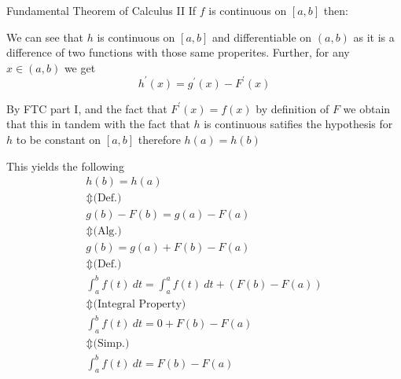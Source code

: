 \begin{theo*}{Fundamental Theorem of Calculus II}
  If $f$ is continuous on $ \left[ a, b \right]$ then:
      \item We can see that $h$ is continuous on $ \left[ a, b \right]$ and differentiable on $ \left(  a, b \right)$ as it is a difference of two functions with those same properites. Further, for any $x \in  \left( a, b \right)$ we get
        \[
        h ^{\prime}\left(x\right) = g ^{\prime}\left(x\right)  -  F ^{\prime}\left(x\right)
        \]
      \item By FTC part I, and the fact that $F ^{\prime}\left(x\right) = f\left(x\right)$ by definition of $F$ we obtain that 
        this in tandem with the fact that $h$ is continuous satifies the hypothesis for $h$ to be constant on $ \left[ a,b \right]$ therefore $h\left(a\right) = h\left(b\right)$ 
      \item This yields the following
        \begin{gather*}
          h\left(b\right) = h\left(a\right) \\
          \Updownarrow \text{(Def.)} \\
          g\left(b\right)  -  F\left(b\right) = g\left(a\right)  -  F\left(a\right)\\
          \Updownarrow \text{(Alg.)} \\
          g\left(b\right)  =    g\left(a\right) + F\left(b\right)  -  F\left(a\right)\\
          \Updownarrow \text{(Def.)} \\
          \int _{a} ^{b} f\left(t\right)\: dt = \int _{a} ^{a} f\left(t\right)\: dt   +  \left( F\left(b\right)  -  F\left(a\right) \right) \\
          \Updownarrow \text{(Integral Property)} \\
          \int _{a} ^{b} f\left(t\right)\: dt = 0  +  F\left(b\right)  -  F\left(a\right) \\
          \Updownarrow \text{(Simp.)} \\
          \int _{a} ^{b} f\left(t\right)\: dt = F\left(b\right)  -  F\left(a\right)
        \end{gather*}
\end{theo*}




